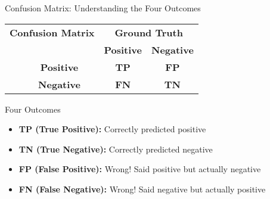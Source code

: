 \documentclass[usenames,dvipsnames]{beamer}
\begin{document}
\begin{frame}{Confusion Matrix: Understanding the Four Outcomes}
\footnotesize
\begin{center}
	\renewcommand{\arraystretch}{1.5}
	\begin{tabular}{cccc}
		\multicolumn{2}{c}{\textbf{Confusion Matrix}} & \multicolumn{2}{c}{\textbf{Ground Truth}} \\
		\multicolumn{2}{c}{} & \textbf{Positive} & \textbf{Negative} \\
		\multirow{2}{*}{\rotatebox[origin=c]{90}{\textbf{Predicted}}} 
		& \textbf{Positive} & \cellcolor{green!40}\textbf{TP} & \cellcolor{orange!40}\textbf{FP} \\
		& \textbf{Negative} & \cellcolor{red!40}\textbf{FN} & \cellcolor{blue!40}\textbf{TN} \\
	\end{tabular}
\end{center}

\vspace{0.3cm}
\begin{definitionbox}{Four Outcomes}
	\begin{itemize}
		\item \textcolor{green!70!black}{\textbf{TP (True Positive):}} Correctly predicted positive 
		\item \textcolor{blue!70!black}{\textbf{TN (True Negative):}} Correctly predicted negative  
		\item \textcolor{orange!70!black}{\textbf{FP (False Positive):}} Wrong! Said positive but actually negative
		\item \textcolor{red!70!black}{\textbf{FN (False Negative):}} Wrong! Said negative but actually positive
	\end{itemize}
\end{definitionbox}
\end{frame}
\end{document}
